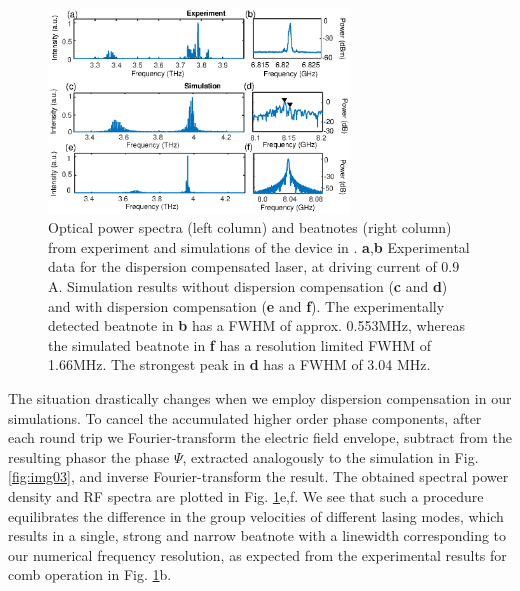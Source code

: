 \documentclass[10pt]{article}
\begin{document}
	\begin{figure}[h!]
			\begin{center}
				\includegraphics[width=8cm]{SPECTRA_EXPERIMENT.eps}
			\end{center}
			\caption{ Optical power spectra (left column) and beatnotes (right column)
				from experiment and simulations of the device in \cite{burghoff2014terahertz}.
				\textbf{a},\textbf{b} Experimental data for the dispersion compensated laser,
				at driving current of $0.9$ A. Simulation results without dispersion
				compensation (\textbf{c} and \textbf{d}) and with dispersion compensation
				(\textbf{e} and \textbf{f}). The experimentally detected beatnote in
				\textbf{b} has a FWHM of approx. 0.553MHz, whereas the simulated beatnote in
				\textbf{f} has a resolution limited FWHM of 1.66MHz. The strongest peak in \textbf{d}
				has a FWHM of 3.04 MHz.}%
			\label{fig:img05}%
		\end{figure}
		
	The situation drastically changes when we employ dispersion compensation in
	our simulations. To cancel the accumulated higher order phase components,
	after each round trip we Fourier-transform the electric field envelope,
	subtract from the resulting phasor the phase $\Psi$, extracted analogously to the simulation
	in Fig. \ref{fig:img03}, and inverse Fourier-transform the result. The
	obtained spectral power density and RF spectra are plotted in Fig.
	\ref{fig:img05}e,f. We see that such a procedure equilibrates the difference
	in the group velocities of different lasing modes, which results in a single, strong and narrow beatnote with a linewidth corresponding to our numerical frequency resolution, as expected from the experimental results for comb operation in Fig. \ref{fig:img05}b.
	
\end{document}
